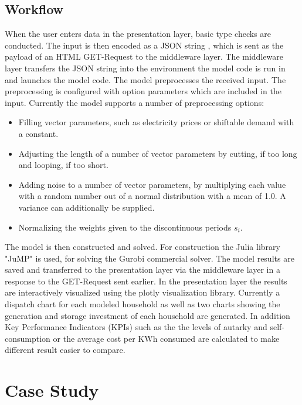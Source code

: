 \documentclass[
	11pt,								%
	DIV10,								%
	a4paper,         					%
	oneside,							%
	headheight=20pt,					%
	footheight=20pt,					%
    parskip=full,						%
    listof=totoc,						%
	bibliography=totoc,					%
	index=totoc,						%
]{scrartcl}
\begin{document}
\subsection{Workflow}
When the user enters data in the presentation layer, basic type checks are conducted. The input is then encoded as a JSON string , which is sent as the payload of an HTML GET-Request  to the middleware layer. The middleware layer transfers the JSON string into the environment the model code is run in and launches the model code. The model preprocesses the received input. The preprocessing is configured with option parameters which are included in the input. Currently the model supports a number of preprocessing options:
\begin{itemize}
	\item Filling vector parameters, such as electricity prices or shiftable demand with a constant. 
	\item Adjusting the length of a number of vector parameters by cutting, if too long and looping, if too short.
	\item Adding noise to a number of vector parameters, by multiplying each value with a random number out of a normal distribution with a mean of 1.0. A variance can additionally be supplied.
	\item Normalizing the weights given to the discontinuous periods $s_i$.
\end{itemize} 
The model is then constructed and solved. For construction the Julia library "JuMP" is used, for solving the Gurobi commercial solver.  The model results are saved and transferred to the presentation layer via the middleware layer in a response to the GET-Request sent earlier. In the presentation layer the results are interactively visualized using the plotly visualization library.  Currently a dispatch chart for each modeled household as well as two charts showing the generation and storage investment of each household are generated. In addition Key Performance Indicators (KPIs) such as the the levels of autarky and self-consumption or the average cost per KWh consumed are calculated to make different result easier to compare.

\newpage
{}	

\section{Case Study}
\end{document}
